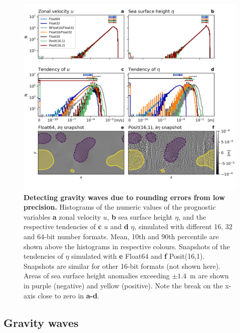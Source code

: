 \begin{figure}
\includegraphics[width=1\textwidth]{Figures/swm/tendency_hist2.png}
\caption{\textbf{Detecting gravity waves due to rounding errors from low precision.} Histograms of the numeric values of the prognostic
variables \textbf{a} zonal velocity $u$, \textbf{b} sea surface height $\eta$, and the respective tendencies of \textbf{c} $u$ and
\textbf{d} $\eta$, simulated with different 16, 32 and 64-bit number formats. Mean, 10th and 90th percentile are shown above the
histograms in respective colours. Snapshots of the tendencies of $\eta$ simulated with \textbf{e} Float64 and \textbf{f} Posit(16,1).
Snapshots are similar for other 16-bit formats (not shown here). Areas of sea surface height anomalies exceeding $\pm1.4$~m are
shown in purple (negative) and yellow (positive). Note the break on the x-axis close to zero in \textbf{a-d}.}
\label{fig:tend}
\end{figure}

\subsection{Gravity waves}

